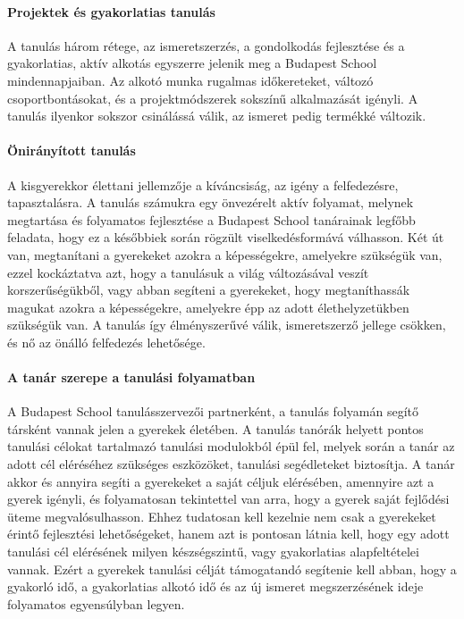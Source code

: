 \paragraph{Projektek és gyakorlatias tanulás}

A tanulás három rétege, az ismeretszerzés, a gondolkodás fejlesztése és
a gyakorlatias, aktív alkotás egyszerre jelenik meg a Budapest School
mindennapjaiban. Az alkotó munka rugalmas időkereteket, változó
csoportbontásokat, és a projektmódszerek sokszínű alkalmazását igényli.
A tanulás ilyenkor sokszor csinálássá válik, az ismeret pedig termékké
változik.

\paragraph{Önirányított
      tanulás}

A kisgyerekkor élettani jellemzője a kíváncsiság, az igény a
felfedezésre, tapasztalásra. A tanulás számukra egy önvezérelt aktív
folyamat, melynek megtartása és folyamatos fejlesztése a Budapest School
tanárainak legfőbb feladata, hogy ez a későbbiek során rögzült
viselkedésformává válhasson. Két út van, megtanítani a gyerekeket azokra
a képességekre, amelyekre szükségük van, ezzel kockáztatva azt, hogy a
tanulásuk a világ változásával veszít korszerűségükből, vagy abban
segíteni a gyerekeket, hogy megtaníthassák magukat azokra a
képességekre, amelyekre épp az adott élethelyzetükben szükségük van. A
tanulás így élményszerűvé válik, ismeretszerző jellege csökken, és nő az
önálló felfedezés lehetősége.

\paragraph{A tanár szerepe a tanulási
      folyamatban}

A Budapest School tanulásszervezői partnerként, a tanulás folyamán
segítő társként vannak jelen a gyerekek életében. A tanulás tanórák
helyett pontos tanulási célokat tartalmazó tanulási modulokból épül fel,
melyek során a tanár az adott cél eléréséhez szükséges eszközöket,
tanulási segédleteket biztosítja. A tanár akkor és annyira segíti a
gyerekeket a saját céljuk elérésében, amennyire azt a gyerek igényli, és
folyamatosan tekintettel van arra, hogy a gyerek saját fejlődési üteme
megvalósulhasson. Ehhez tudatosan kell kezelnie nem csak a gyerekeket
érintő fejlesztési lehetőségeket, hanem azt is pontosan látnia kell,
hogy egy adott tanulási cél elérésének milyen készségszintű, vagy
gyakorlatias alapfeltételei vannak. Ezért a gyerekek tanulási célját
támogatandó segítenie kell abban, hogy a gyakorló idő, a gyakorlatias
alkotó idő és az új ismeret megszerzésének ideje folyamatos egyensúlyban
legyen.


